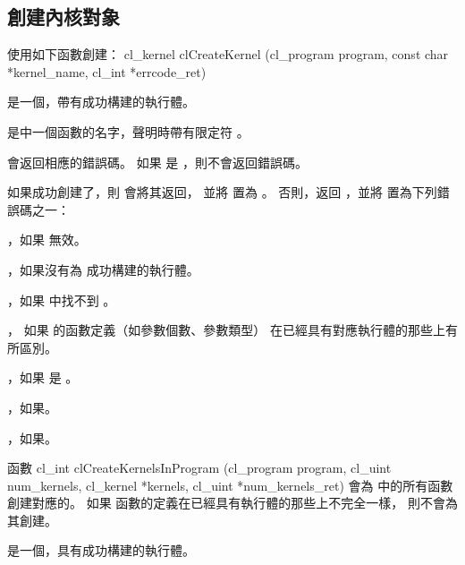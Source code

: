 \subsection{創建內核對象}

使用如下函數創建：
\startclc
cl_kernel clCreateKernel (cl_program program,
			const char *kernel_name,
			cl_int *errcode_ret)
\stopclc

 是一個，帶有成功構建的執行體。

 是中一個函數的名字，聲明時帶有限定符 。

 會返回相應的錯誤碼。
如果  是 ，則不會返回錯誤碼。

如果成功創建了，則  會將其返回，
並將  置為 。
否則，返回 ，並將  置為下列錯誤碼之一：
\startigBase
\item {}，如果  無效。

\item {}，如果沒有為  成功構建的執行體。

\item {}，如果  中找不到 。

\item {}，
如果  的函數定義（如參數個數、參數類型）
在已經具有對應執行體的那些上有所區別。

\item {}，如果  是 。

\item {}，如果\scdevfailres。

\item {}，如果\schostfailres。
\stopigBase

函數
\startclc
cl_int clCreateKernelsInProgram (cl_program program,
			cl_uint num_kernels,
			cl_kernel *kernels,
			cl_uint *num_kernels_ret)
\stopclc
會為  中的所有函數創建對應的。
如果  函數的定義在已經具有執行體的那些上不完全一樣，
則不會為其創建。

 是一個，具有成功構建的執行體。

